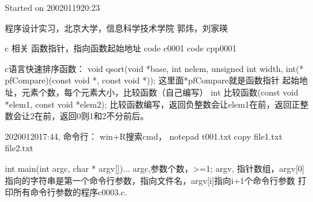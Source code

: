 \documentclass[UTF8]{article}
\begin{document}
Started on 2002011920:23

程序设计实习，北京大学，信息科学技术学院
郭炜，刘家瑛

c 相关
函数指针，指向函数起始地址
code c0001
code cpp0001



c语言快速排序函数：
void qsort(void *base, int nelem, unsigned int width, int(* pfCompare)(const void *, const void *));
这里面*pfCompare就是函数指针
起始地址，元素个数，每个元素大小，比较函数（自己编写）
int 比较函数(const void *elem1, const void *elem2);
比较函数编写，返回负整数会让elem1在前，返回正整数会让2在前，返回0则1和2不分前后。

2020012017:44,
命令行：
win+R搜索cmd，
notepad t001.txt
copy file1.txt file2.txt

int main(int argc, char * argv[]){...}
argc,参数个数，>=1;
argv, 指针数组，argv[0]指向的字符串是第一个命令行参数，指向文件名，argv[i]指向i+1个命令行参数
打印所有命令行参数的程序c0003.c.
\end{document}
